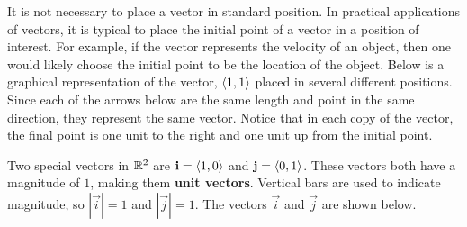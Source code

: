 \documentclass[handout]{ximera}
\begin{document}
It is not necessary to place a vector in standard position.  
In practical applications of vectors, it is typical to place the initial point of a vector in a position of interest.  
For example, if the vector represents the velocity of an object, then one would likely choose the initial point to be the location of the object.
Below is a graphical representation of the vector, $\left\langle 1,1\right\rangle$ placed in several different positions.
Since each of the arrows below are the same length and point in the same direction, they represent the same vector.
Notice that in each copy of the vector, the final point is one unit to the right and one unit up from the initial point. 
\begin{image}
\end{image}

Two special vectors in $\mathbb R^2$ are $\mathbf{i} = \left\langle 1,0\right\rangle$ and $\mathbf{j} = \left\langle 0,1\right\rangle$.
These vectors both have a magnitude of $1$, making them {\bf unit vectors}. 
Vertical bars are used to indicate magnitude, so $|\vec{i}| = 1$ and $|\vec{j}| = 1$.
The vectors $\vec{i}$ and $\vec{j}$ are shown below.

\begin{image}
\end{image}
\end{document}
